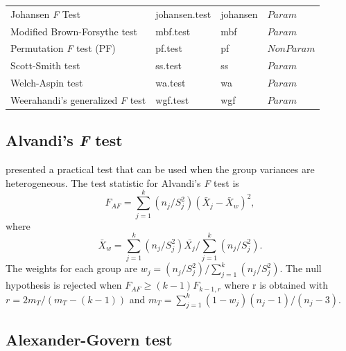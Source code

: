 \begin{table}[H]
\begin{tabular}{llll}
Johansen \textit{F} Test  & johansen.test & johansen & \textbf{$Param$} \\
Modified Brown-Forsythe test    & mbf.test   & mbf & \textbf{$Param$} \\
Permutation \textit{F} test (PF)   & pf.test   & pf & \textbf{$NonParam$} \\
Scott-Smith test  & ss.test  & ss & \textbf{$Param$} \\
Welch-Aspin test   & wa.test   & wa & \textbf{$Param$} \\
Weerahandi’s generalized \textit{F} test & wgf.test  & wgf & \textbf{$Param$} \\    
\hline
\end{tabular}
\label{oneway22tests}
\end{table}




\subsection{ Alvandi's \textit{F} test}
\citet{sadooghi2012} presented a practical test that can be used when the group variances are heterogeneous. The test statistic for Alvandi's \textit{F} test is
\begin{equation}
F_{AF}=\displaystyle\sum\limits_{j=1}^k (n_j/S_j^2)(\bar{X}_{j}-\bar{X}_{w})^2,
\end{equation}
where \begin{equation}\label{eq:Xw}
 \bar{X}_{w}=\displaystyle\sum\limits_{j=1}^k (n_j/S_j^2)\bar{X_j}/\displaystyle\sum\limits_{j=1}^k (n_j/S_j^2).    
\end{equation}
 The weights for each group are \begin{math} w_j=({n_j/S_j^2})/{\displaystyle\sum\limits_{j=1}^k (n_j/S_j^2)} \end{math}.
The null hypothesis is rejected when \begin{math} F_{AF}\geqslant(k-1) F_{k-1, r} \end{math} where r is obtained with \begin{math} r={2m_T}/({m_T-(k-1)}) \end{math} 
and \begin{math} m_T={\sum\limits_{j=1}^k (1-w_j)(n_{j}-1)/(n_j-3)} \end{math}.

\subsection{Alexander-Govern test} 

